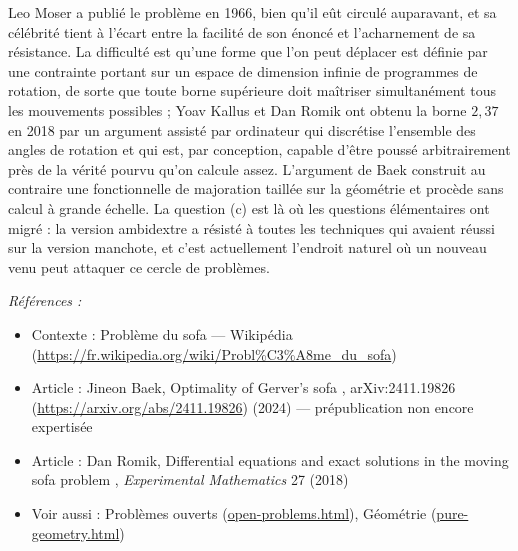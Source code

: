 \documentclass[11pt]{article}
\newenvironment{refs}{\par\small\noindent\emph{Références :}\begin{itemize}\setlength\itemsep{0pt}}{\end{itemize}\normalsize}
\begin{document}
\noindent Leo Moser a publié le problème en 1966, bien qu'il eût circulé auparavant, et sa célébrité tient à l'écart entre la facilité de son énoncé et l'acharnement de sa résistance. La difficulté est qu'une \og{} forme que l'on peut déplacer \fg{} est définie par une contrainte portant sur un espace de dimension infinie de programmes de rotation, de sorte que toute borne supérieure doit maîtriser simultanément tous les mouvements possibles ; Yoav Kallus et Dan Romik ont obtenu la borne $ 2{,}37 $ en 2018 par un argument assisté par ordinateur qui discrétise l'ensemble des angles de rotation et qui est, par conception, capable d'être poussé arbitrairement près de la vérité pourvu qu'on calcule assez. L'argument de Baek construit au contraire une fonctionnelle de majoration taillée sur la géométrie et procède sans calcul à grande échelle. La question (c) est là où les questions élémentaires ont migré : la version ambidextre a résisté à toutes les techniques qui avaient réussi sur la version manchote, et c'est actuellement l'endroit naturel où un nouveau venu peut attaquer ce cercle de problèmes.

\begin{refs}
\item Contexte : Problème du sofa --- Wikipédia (\url{https://fr.wikipedia.org/wiki/Probl%C3%A8me_du_sofa})
\item Article : Jineon Baek, \og{} Optimality of Gerver's sofa \fg{}, arXiv:2411.19826 (\url{https://arxiv.org/abs/2411.19826}) (2024) --- prépublication non encore expertisée
\item Article : Dan Romik, \og{} Differential equations and exact solutions in the moving sofa problem \fg{}, \textit{Experimental Mathematics} 27 (2018)
\item Voir aussi : Problèmes ouverts (\url{open-problems.html}), Géométrie (\url{pure-geometry.html})
\end{refs}

\bigskip
\end{document}
